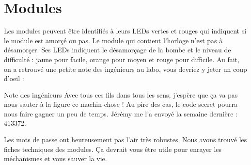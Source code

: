 \chapter{Modules}
Les modules peuvent être identifiés à leurs LEDs vertes et rouges qui indiquent
si le module est amorçé ou pas. Le module qui contient l'horloge n'est pas à
désamorçer. Ses LEDs indiquent le désamorçage de la bombe et le niveau de difficulté : jaune 
pour facile, orange pour moyen et rouge pour difficile. Au fait, on a retrouvé une petite 
note des ingénieurs au labo, vous devriez y jeter un coup d'oeil :
\vspace{.5cm}
\begin{paperbox}{Note des ingénieurs}
  Avec tous ces fils dans tous les sens, j'espère que ça va pas nous sauter à la
  figure ce machin-chose ! Au pire des cas, le code secret pourra nous faire
  gagner un peu de temps. Jérémy me l'a envoyé la semaine dernière : 413372.
\end{paperbox}
\vspace{.5cm}

Les mots de passe ont heureusement pas l'air très robustes. Nous avons trouvé
les fiches techniques des modules. Ça devrait vous être utile pour enrayer les
méchanismes et vous sauver la vie.
\newpage

